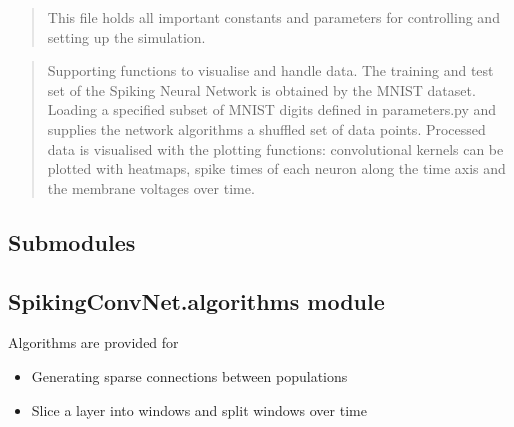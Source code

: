 \documentclass[letterpaper,10pt,english]{sphinxmanual}
\begin{document}
\begin{quote}

This file holds all important constants and parameters for controlling and
setting up the simulation.
\end{quote}

\begin{quote}

Supporting functions to visualise and handle data. The training and test set
of the Spiking Neural Network is obtained by the MNIST dataset. Loading
a specified subset of MNIST digits defined in parameters.py and supplies the
network algorithms a shuffled set of data points.
Processed data is visualised with the plotting functions: convolutional kernels
can be plotted with heatmaps, spike times of each neuron along the time axis
and the membrane voltages over time.
\end{quote}


\subsection{Submodules}
\label{\detokenize{SpikingConvNet:submodules}}

\subsection{SpikingConvNet.algorithms module}
\label{\detokenize{SpikingConvNet:module-SpikingConvNet.algorithms}}\label{\detokenize{SpikingConvNet:spikingconvnet-algorithms-module}}
Algorithms are provided for
\begin{itemize}
\item {} 
Generating sparse connections between populations

\item {} 
Slice a layer into windows and split windows over time

\end{itemize}
\end{document}
